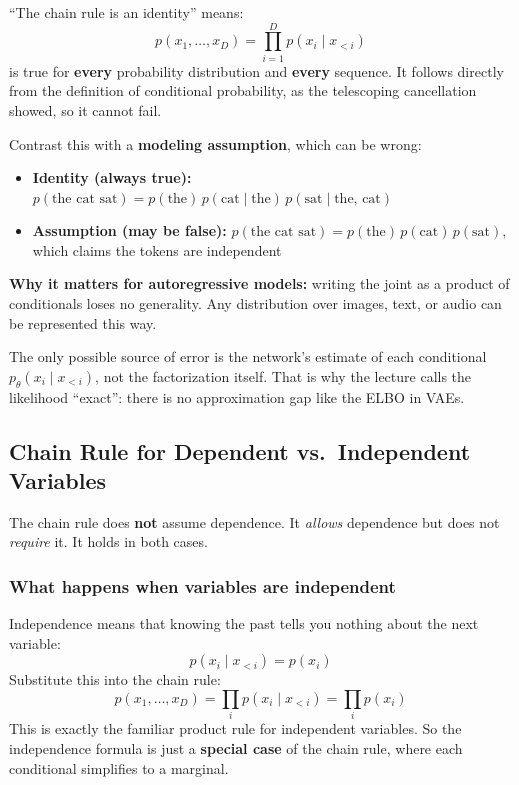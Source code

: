``The chain rule is an identity'' means:
\[
p(x_1, \dots, x_D) = \prod_{i=1}^{D} p(x_i \mid x_{<i})
\]
is true for \textbf{every} probability distribution and \textbf{every} sequence. It follows directly from the definition of conditional probability, as the telescoping cancellation showed, so it cannot fail.

Contrast this with a \textbf{modeling assumption}, which can be wrong:
\begin{itemize}
  \item \textbf{Identity (always true):} $p(\text{the cat sat}) = p(\text{the})\,p(\text{cat} \mid \text{the})\,p(\text{sat} \mid \text{the, cat})$
  \item \textbf{Assumption (may be false):} $p(\text{the cat sat}) = p(\text{the})\,p(\text{cat})\,p(\text{sat})$, which claims the tokens are independent
\end{itemize}

\textbf{Why it matters for autoregressive models:} writing the joint as a product of conditionals loses no generality. Any distribution over images, text, or audio can be represented this way.

The only possible source of error is the network's estimate of each conditional $p_\theta(x_i \mid x_{<i})$, not the factorization itself. That is why the lecture calls the likelihood ``exact'': there is no approximation gap like the ELBO in VAEs.

\subsection*{Chain Rule for Dependent vs.\ Independent Variables}

The chain rule does \textbf{not} assume dependence. It \textit{allows} dependence but does not \textit{require} it. It holds in both cases.

\subsubsection*{What happens when variables are independent}

Independence means that knowing the past tells you nothing about the next variable:
\[
p(x_i \mid x_{<i}) = p(x_i)
\]
Substitute this into the chain rule:
\[
p(x_1, \dots, x_D) = \prod_{i} p(x_i \mid x_{<i}) = \prod_{i} p(x_i)
\]
This is exactly the familiar product rule for independent variables. So the independence formula is just a \textbf{special case} of the chain rule, where each conditional simplifies to a marginal.

